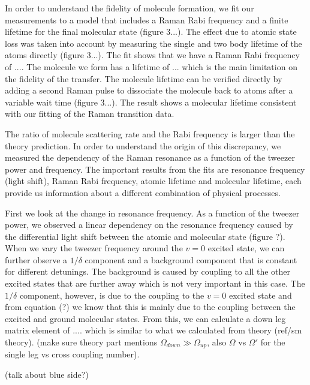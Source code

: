 \documentclass[aps,prl,twocolumn,groupedaddress]{revtex4-1}
\begin{document}
In order to understand the fidelity of molecule formation, we fit our measurements to a model that includes a Raman Rabi frequency and a finite lifetime for the final molecular state (figure 3...). The effect due to atomic state loss was taken into account by measuring the single and two body lifetime of the atoms directly (figure 3...). The fit shows that we have a Raman Rabi frequency of $...$. The molecule we form has a lifetime of $...$ which is the main limitation on the fidelity of the transfer. The molecule lifetime can be verified directly by adding a second Raman pulse to dissociate the molecule back to atoms after a variable wait time (figure 3...). The result shows a molecular lifetime consistent with our fitting of the Raman transition data.

The ratio of molecule scattering rate and the Rabi frequency is larger than the theory prediction.
In order to understand the origin of this discrepancy, we measured the dependency of the Raman resonance as a function of the tweezer power and frequency. The important results from the fits are resonance frequency (light shift), Raman Rabi frequency, atomic lifetime and molecular lifetime, each provide us information about a different combination of physical processes.

First we look at the change in resonance frequency. As a function of the tweezer power, we observed a linear dependency on the resonance frequency caused by the differential light shift between the atomic and molecular state (figure ?). When we vary the tweezer frequency around the $v=0$ excited state, we can further observe a $1/\delta$ component and a background component that is constant for different detunings. The background is caused by coupling to all the other excited states that are further away which is not very important in this case. The $1/\delta$ component, however, is due to the coupling to the $v=0$ excited state and from equation (?) we know that this is mainly due to the coupling between the excited and ground molecular states. From this, we can calculate a down leg matrix element of $....$ which is similar to what we calculated from theory (ref/sm theory). (make sure theory part mentions $\Omega_{down}\gg\Omega_{up}$, also $\Omega$ vs $\Omega'$ for the single leg vs cross coupling number).

(talk about blue side?)
\end{document}
